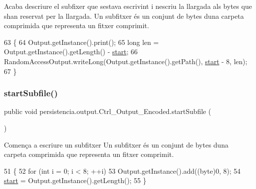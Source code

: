 Acaba d\textquotesingle{}escriure el subfixer que s\textquotesingle{}estava escrivint i n\textquotesingle{}escriu la llargada als bytes que s\textquotesingle{}han reservat per la llargada. Un subfitxer és un conjunt de bytes d\textquotesingle{}una carpeta comprimida que representa un fitxer comprimit. 


\begin{DoxyCode}
63                              \{
64         Output.getInstance().print();
65         \textcolor{keywordtype}{long} len = Output.getInstance().getLength() - \hyperlink{classpersistencia_1_1output_1_1Ctrl__Output__Encoded_a297adbe95417ad0a03883da607ec6dfe}{start};
66         RandomAccessOutput.writeLong(Output.getInstance().getPath(), \hyperlink{classpersistencia_1_1output_1_1Ctrl__Output__Encoded_a297adbe95417ad0a03883da607ec6dfe}{start} - 8, len);
67     \}
\end{DoxyCode}
\mbox{\label{classpersistencia_1_1output_1_1Ctrl__Output__Encoded_a2cabdf68c3f3a5731933f78609d9c302}} 
\subsubsection{\texorpdfstring{start\+Subfile()}{startSubfile()}}
{\footnotesize\ttfamily public void persistencia.\+output.\+Ctrl\+\_\+\+Output\+\_\+\+Encoded.\+start\+Subfile (\begin{DoxyParamCaption}{ }\end{DoxyParamCaption})\hspace{0.3cm}{\ttfamily [inline]}}



Comença a escriure un subfitxer Un subfitxer és un conjunt de bytes d\textquotesingle{}una carpeta comprimida que representa un fitxer comprimit. 


\begin{DoxyCode}
51                                \{
52         \textcolor{keywordflow}{for} (\textcolor{keywordtype}{int} i = 0; i < 8; ++i)
53             Output.getInstance().add((byte)0, 8);
54         \hyperlink{classpersistencia_1_1output_1_1Ctrl__Output__Encoded_a297adbe95417ad0a03883da607ec6dfe}{start} = Output.getInstance().getLength();
55     \}
\end{DoxyCode}


